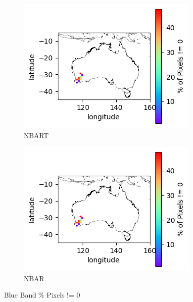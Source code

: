 \documentclass[a4paper]{article}
\begin{document}
      \begin{figure}[h!]
        \centering
          \begin{subfigure}[l]{.4\linewidth}
            \hspace{-32mm}
            \includegraphics[scale=0.9]{plots/nbart/nbart_blue-PercentDifferent.png}
            \caption{NBART}
          \end{subfigure}
%
          \begin{subfigure}[r]{.4\linewidth}
            \includegraphics[scale=0.9]{plots/nbar/nbar_blue-PercentDifferent.png}
            \caption{NBAR}
          \end{subfigure}
        \caption{Blue Band \% Pixels != 0}\label{figure:24}
      \end{figure}

  \clearpage
\end{document}
